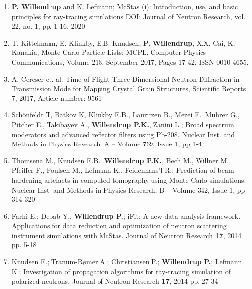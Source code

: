 \begin{enumerate}
       McStas (ii): An overview of components, their use, and advice
       for user contributions, Journal of Neutron Research, pre-press 2021 \\     
     \item {\bf P. Willendrup} and K. Lefmann;
       McStas (i): Introduction, use, and basic principles for
       ray-tracing simulations DOI: Journal of Neutron Research,
       vol. 22, no. 1, pp. 1-16, 2020 \\     
    \item T. Kittelmann, E. Klinkby, E.B. Knudsen, {\bf P. Willendrup}, X.X. Cai, K. Kanakia;
      Monte Carlo Particle Lists: MCPL, Computer Physics Communications, Volume 218, September 2017, Pages 17-42, ISSN 0010-4655, \\
    \item A. Cereser et. al. Time-of-Flight Three Dimensional Neutron
      Diffraction in Transmission Mode for Mapping Crystal Grain
      Structures, Scientific Reports 7, 2017, Article number: 9561   
 \item Sch\"onfeldt T, Batkov K, Klinkby E.B., Lauritzen B., Mezei
      F., Muhrer G., Pitcher E., Takibayev A., {\bf Willendrup P.K.},
      Zanini L.; Broad spectrum moderators and advanced reflector
      filters using Pb-208. Nuclear Inst. and Methods in Physics
      Research, A -- Volume 769, Issue 1, pp 1-4
    \item Thomsena M., Knudsen E.B., {\bf Willendrup P.K.}, Bech M.,
      Willner M., Pfeiffer F., Poulsen M., Lefmann K., Feidenhans’l
      R.; Prediction of beam hardening artefacts in computed
      tomography using Monte Carlo simulations. Nuclear Inst. and
      Methods in Physics Research, B -- Volume 342, Issue 1, pp 314-320
    \item Farhi E.; Debab Y., {\bf Willendrup P.}; iFit: A new data analysis framework. Applications for data reduction and optimization of neutron scattering instrument simulations with McStas. Journal of Neutron Research {\bf 17}, 2014 pp. 5-18
  \item Knudsen E.; Tranum-R\o mer A.; Christiansen P.; {\bf Willendrup P.}; Lefmann K.; Investigation of propagation algorithms for ray-tracing simulation of polarized neutrons.  Journal of Neutron Research
  {\bf 17}, 2014 pp. 27-34

\end{enumerate}
